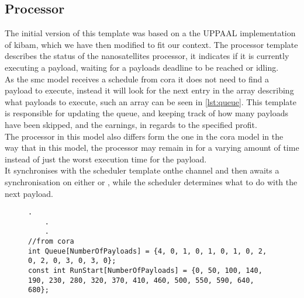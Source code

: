 \subsection{Processor}
The initial version of this template was based on a the UPPAAL implementation of \gls{kibam}, which we have then modified to fit our context. The processor template describes the status of the nanosatellites processor, it indicates if it is currently executing a payload, waiting for a payloads deadline to be reached or idling.\\
As the \gls{smc} model receives a schedule from \gls{cora} it does not need to find a payload to execute, instead it will look for the next entry in the array describing what payloads to execute, such an array can be seen in \cref{lst:queue}. This template is responsible for updating the queue, and keeping track of how many payloads have been skipped, and the earnings, in regards to the specified profit.\\
The processor in this model also differs form the one in the \gls{cora} model in the way that in this model, the processor may remain in  for a varying amount of time instead of just the worst execution time for the payload.\\
It synchronises with the scheduler template onthe channel  and then awaits a synchronisation on either  or , while the scheduler determines what to do with the next payload.
\begin{figure}[H]
	\begin{lstlisting}[language=my_c, caption={Payload queue with start times, extracted from the \gls{cora} model}, label=lst:queue, firstnumber=53]
	.
	.
	.
//from cora
int Queue[NumberOfPayloads] = {4, 0, 1, 0, 1, 0, 1, 0, 2, 0, 2, 0, 3, 0, 3, 0};
const int RunStart[NumberOfPayloads] = {0, 50, 100, 140, 190, 230, 280, 320, 370, 410, 460, 500, 550, 590, 640, 680};
	\end{lstlisting}
\end{figure}




